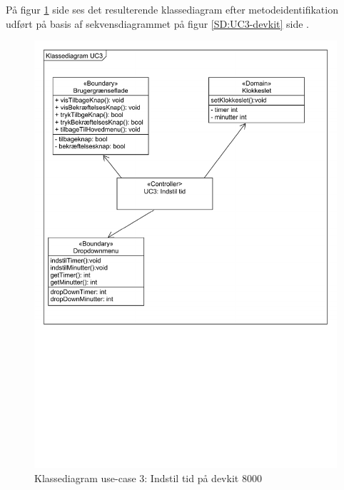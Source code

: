 På figur \ref{CD:UC3-devkit} side \pageref{CD:UC3-devkit} ses det resulterende klassediagram efter metodeidentifikation udført på basis af sekvensdiagrammet på figur \ref{SD:UC3-devkit} side \pageref{SD:UC3-devkit}.
\begin{figure}[H]
	\caption{Klassediagram use-case 3: Indstil tid på devkit 8000}
	\label{CD:UC3-devkit}
	\includegraphics[scale=0.6,trim=10 800 100 0]{Applikationsmodel_UC3/Klassediagram_UC3.pdf}
\end{figure}
